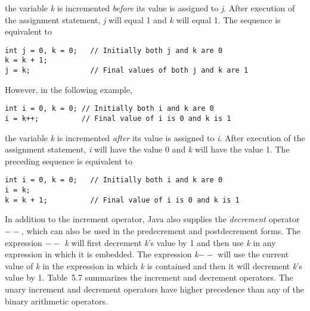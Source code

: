 \noindent the variable {\it k} is incremented {\it before}
its value is assigned to {\it j}. After execution of the assignment
statement, {\it j} will equal 1 and {\it k} will equal 1. The 
sequence is equivalent to

\begin{jjjlisting}
\begin{lstlisting}
int j = 0, k = 0;   // Initially both j and k are 0
k = k + 1;
j = k;              // Final values of both j and k are 1
\end{lstlisting}
\end{jjjlisting}

\noindent However, in the following example,

\begin{jjjlisting}
\begin{lstlisting}
int i = 0, k = 0; // Initially both i and k are 0
i = k++;          // Final value of i is 0 and k is 1
\end{lstlisting}
\end{jjjlisting}

\noindent the variable {\it k} is incremented {\it after}
its value is assigned to {\it i}. After execution of the assignment
statement, {\it i} will have the value 0 and {\it k} will have the
value 1. The preceding sequence is equivalent to

\begin{jjjlisting}
\begin{lstlisting}
int i = 0, k = 0;   // Initially both i and k are 0
i = k;
k = k + 1;          // Final value of i is 0 and k is 1
\end{lstlisting}
\end{jjjlisting}

\noindent In addition to the increment operator, Java also supplies the {\it
decrement} operator {\it $--$}, which can
also be used in the predecrement and
postdecrement forms.   The expression {\it $--$ k}
will first decrement {\it k}'s value by 1 and then use {\it k} in
any expression in which it is embedded.  The expression {\it k$--$} will
use the current value of {\it k} in the expression in which {\it k} is
contained and then it will decrement {\it k}'s value by
1. Table~5.7 summarizes the increment and decrement
operators.  The unary increment and decrement operators have higher
precedence than any of the binary arithmetic operators.

